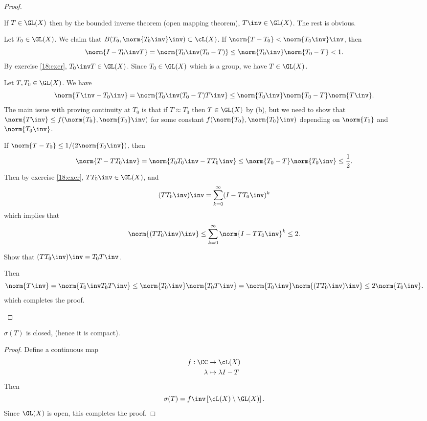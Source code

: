 \begin{proof}
  \leavevmode
  \begin{enum}
    \io
    If $T \in \GL(X)$ then by the bounded inverse theorem (open mapping theorem), $T\inv \in \GL(X)$.
    The rest is obvious.

    \io
    Let $T_0 \in \GL(X)$.
    We claim that $B(T_0, \norm{T_0\inv}\inv) \subset \cL(X)$.
    If $\norm{T-T_0}<\norm{T_0\inv}\inv$, then
    \[ \norm{I-T_0\inv T} = \norm{T_0\inv (T_0-T)} \leq \norm{T_0\inv}\norm{T_0-T} < 1. \]
    By exercise \ref{18:exer}, $T_0\inv T \in \GL(X)$.
    Since $T_0 \in \GL(X)$ which is a group, we have $T \in \GL(X)$.

    \io
    Let $T,T_0 \in \GL(X)$.
    We have
    \[ \norm{T\inv-T_0\inv} = \norm{T_0\inv(T_0-T)T\inv} \leq \norm{T_0\inv}\norm{T_0-T}\norm{T\inv}. \]
    The main issue with proving continuity at $T_0$ is that if $T \approx T_0$ then $T \in \GL(X)$ by (b), but we need to show that $\norm{T\inv} \leq f(\norm{T_0},\norm{T_0}\inv)$ for some constant $f(\norm{T_0},\norm{T_0}\inv)$ depending on $\norm{T_0}$ and $\norm{T_0\inv}$.

    If $\norm{T-T_0} \leq 1/(2\norm{T_0\inv})$, then
    \[ \norm{T-TT_0\inv} = \norm{T_0T_0\inv-TT_0\inv} \leq \norm{T_0-T}\norm{T_0\inv} \leq \frac 12. \]
    Then by exercise \ref{18:exer}, $TT_0\inv \in \GL(X)$, and
    \[ (TT_0\inv)\inv = \sum_{k=0}^\infty (I-TT_0\inv)^k \]
    which implies that
    \[ \norm{(TT_0\inv)\inv} \leq \sum_{k=0}^\infty \norm{I-TT_0\inv}^k \leq 2. \]

  \begin{exer}
    Show that $(TT_0\inv)\inv = T_0T\inv$.
  \end{exer}

  Then
  \[ \norm{T\inv} = \norm{T_0\inv T_0 T\inv} \leq \norm{T_0\inv}\norm{T_0T\inv} = \norm{T_0\inv} \norm{(TT_0\inv)\inv} \leq 2\norm{T_0\inv}. \]
  which completes the proof.
  \end{enum}
\end{proof}

\begin{cor}
  $\sigma(T)$ is closed, (hence it is compact).
\end{cor}

\begin{proof}
  Define a continuous map
  \begin{align*}
    f: \CC &\to \cL(X) \\
    \lambda &\mapsto \lambda I-T
  \end{align*}
  Then
  \[ \sigma(T) = f\inv\left[ \cL(X) \setminus \GL(X) \right]. \]
  Since $\GL(X)$ is open, this completes the proof.
\end{proof}
